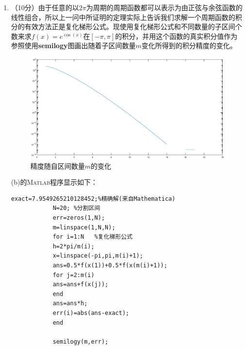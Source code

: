 \documentclass[12pt,a4paper,utf8]{ctexart}
\begin{document}
\begin{enumerate}
		\item[(b)]（10分）由于任意的以$2\pi$为周期的周期函数都可以表示为由正弦与余弦函数的线性组合，所以上一问中所证明的定理实际上告诉我们求解一个周期函数的积分的有效方法正是复化梯形公式。现使用复化梯形公式和不同数量的子区间个数来求$f(x) = e^{\cos(x)}$在$[−\pi, \pi]$的积分，并用这个函数的真实积分值作为参照使用\textbf{semilogy}图画出随着子区间数量$m$变化所得到的积分精度的变化。\\
		\begin{figure}[H]  
			\centering
			\includegraphics[width=\textwidth]{semilogy2}
			\caption{精度随自区间数量$m$的变化}  
			\label{3}  
		\end{figure}
		(b)的\textsc{Matlab}程序显示如下：
		\begin{lstlisting}[breaklines,frame=single]
			exact=7.9549265210128452;%精确解(来自Mathematica)
			N=20; %分割区间
			err=zeros(1,N);
			m=linspace(1,N,N);
			for i=1:N	%复化梯形公式
			h=2*pi/m(i);
			x=linspace(-pi,pi,m(i)+1);
			ans=0.5*f(x(1))+0.5*f(x(m(i)+1));
			for j=2:m(i)
			ans=ans+f(x(j));
			end
			ans=ans*h;
			err(i)=abs(ans-exact);
			end
			
			semilogy(m,err);
			

\end{lstlisting}
\end{enumerate}
\end{document}
